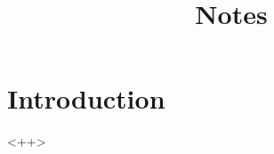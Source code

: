 \documentclass[a4paper]{article}
\date{}
\title{Notes}
\begin{document}
\maketitle
\vspace{-2.5cm}
\section{Introduction}
<++>
\end{document}
